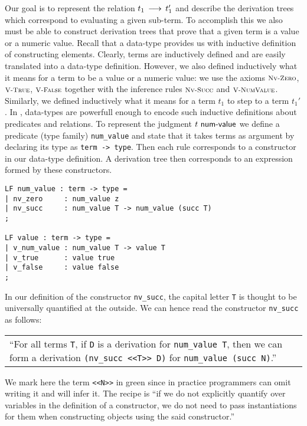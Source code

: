 Our  goal  is  to  represent  the  relation  $t_1 \mathrel{\,\longrightarrow\,} t_1'$ and  describe the
derivation trees which correspond to evaluating a given sub-term.
To accomplish this we also must be able to construct derivation trees that prove
that  a given  term is  a value  or a  numeric  value. Recall  that a  data-type
provides us with inductive definition of constructing elements.
Clearly,  terms  are  inductively  defined  and  are  easily  translated  into a
data-type definition. However,  we also defined inductively  what it means for a
term  to be a value or a numeric value:  we use the  axioms $\textsc{\footnotesize Nv-Zero}$, $\textsc{\footnotesize V-True}$,
$\textsc{\footnotesize V-False}$  together  with  the   inference  rules  $\textsc{\footnotesize Nv-Succ}$  and  $\textsc{\footnotesize V-NumValue}$.
Similarly,  we defined inductively  what it means for a term $t_1$  to step to a
term $t_1'$.
In \beluga, data-types are powerfull enough to encode such inductive definitions
about  predicates  and  relations.  To represent the judgment  $t ~\textsf{num-value}$  we
define  a predicate (type family) \lstinline!num_value!  and state that it takes
terms as argument  by declaring its type as \lstinline!term -> type!.  Then each
rule corresponds to a constructor in our data-type definition. A derivation tree
then corresponds to an expression formed by these constructors.

\begin{lstlisting}
LF num_value : term -> type =
| nv_zero     : num_value z
| nv_succ     : num_value T -> num_value (succ T)
;

LF value : term -> type =
| v_num_value : num_value T -> value T
| v_true      : value true
| v_false     : value false
;
\end{lstlisting}

In our definition  of  the constructor \lstinline!nv_succ!, the  capital  letter
\lstinline!T! is thought  to be  universally quantified  at the outside.  We can
hence read the constructor \lstinline!nv_succ! as follows:

\begin{center}
\begin{tabular}{p{12cm}}
``For  all  terms   \lstinline$T$,   if   \lstinline!D!  is  a  derivation   for
\lstinline!num_value T!,      then      we     can     form     a     derivation
\lstinline!(nv_succ <<T>> D)! for \lstinline!num_value (succ N)!.''
\end{tabular}
\end{center}


We mark here  the term \lstinline!<<N>>! in green  since in practice programmers
can omit  writing it  and \beluga  will infer it.  The recipe is  ``if we do not
explicitly quantify over variables in the definition of a constructor, we do not
need  to pass instantiations  for them when constructing objects  using the said
constructor.''

